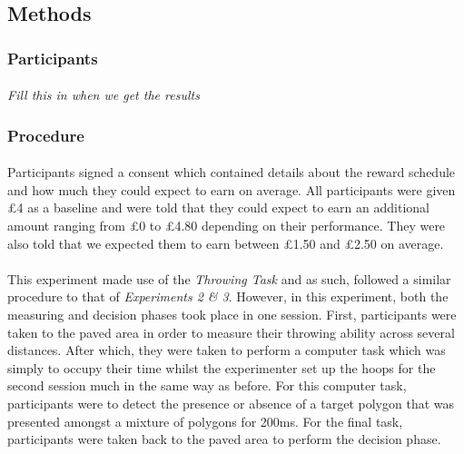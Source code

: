 \documentclass[12pt]{article}
\begin{document}
\subsection*{Methods}
\subsubsection*{Participants}
\paragraph{} \textit{Fill this in when we get the results}

\subsubsection*{Procedure} 
\paragraph{} Participants signed a consent which contained details about the reward schedule and how much they could expect to earn on average. All participants were given £4 as a baseline and were told that they could expect to earn an additional amount ranging from £0 to £4.80 depending on their performance. They were also told that we expected them to earn between £1.50 and £2.50 on average.  

\paragraph{} This experiment made use of the \textit{Throwing Task} and as such, followed a similar procedure to that of \textit{Experiments 2 \& 3}. However, in this experiment, both the measuring and decision phases took place in one session. First, participants were taken to the paved area in order to measure their throwing ability across several distances. After which, they were taken to perform a computer task which was simply to occupy their time whilst the experimenter set up the hoops for the second session much in the same way as before. For this computer task, participants were to detect the presence or absence of a target polygon that was presented amongst a mixture of polygons for 200ms. For the final task, participants were taken back to the paved area to perform the decision phase. 
\end{document}
